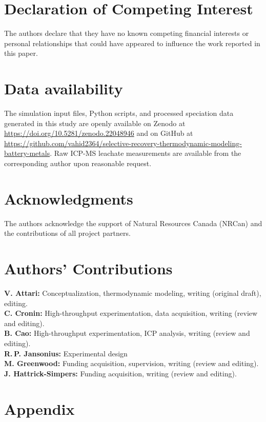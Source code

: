 \documentclass[final,2p,times]{elsarticle}
\begin{document}
\section*{Declaration of Competing Interest}
The authors declare that they have no known competing financial interests or personal relationships that could have appeared to influence the work reported in this paper.

\section*{Data availability}
The simulation input files, Python scripts, and processed speciation data generated in this study are openly available on Zenodo at \url{https://doi.org/10.5281/zenodo.22048946} and on GitHub at \url{https://github.com/vahid2364/selective-recovery-thermodynamic-modeling-battery-metals}. Raw ICP-MS leachate measurements are available from the corresponding author upon reasonable request.

\section*{Acknowledgments}
The authors acknowledge the support of Natural Resources Canada (NRCan) and the contributions of all project partners.

\section*{Authors' Contributions}
\noindent
\textbf{V. Attari:} Conceptualization, thermodynamic modeling, writing (original draft), editing. \\
\textbf{C. Cronin:} High-throughput experimentation, data acquisition, writing (review and editing). \\
\textbf{B. Cao:} High-throughput experimentation, ICP analysis, writing (review and editing). \\
\textbf{R.\,P. Jansonius:} Experimental design \\
\textbf{M. Greenwood:} Funding acquisition, supervision, writing (review and editing). \\
\textbf{J. Hattrick-Simpers:} Funding acquisition, writing (review and editing).




\section*{Appendix}
\end{document}
